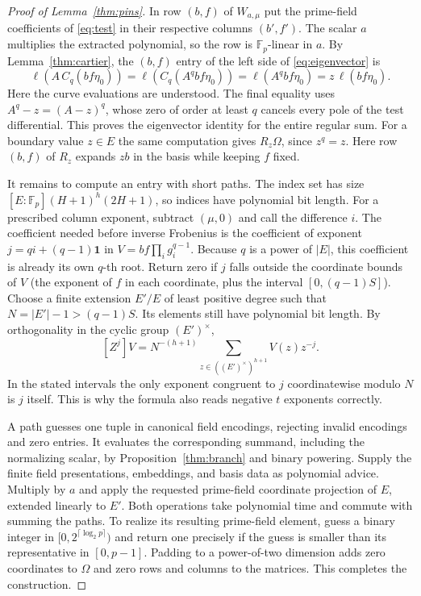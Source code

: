 \documentclass[11pt,letterpaper]{article}
\theoremstyle{definition}
\numberwithin{equation}{section}
\begin{document}
\begin{proof}[Proof of Lemma~\ref{thm:pins}]
In row $(b,f)$ of $W_{a,\mu}$ put the prime-field coefficients of \eqref{eq:test} in their
respective columns $(b',f')$. The scalar $a$ multiplies the extracted polynomial, so the row is
$\mathbb{F}_p$-linear in $a$. By Lemma~\ref{thm:cartier}, the $(b,f)$ entry of the left side of
\eqref{eq:eigenvector} is
\[
  \ell(A\,C_q(bf\eta_0))=\ell(C_q(A^q bf\eta_0))=\ell(A^q bf\eta_0)=z\,\ell(bf\eta_0).
\]
Here the curve evaluations are understood. The final equality uses $A^q-z=(A-z)^q$, whose
zero of order at least $q$ cancels every pole of the test differential. This proves the eigenvector
identity for the entire regular sum. For a boundary value $z\in E$ the same computation gives
$R_z \Omega$, since $z^q=z$. Here row $(b,f)$ of $R_z$ expands $zb$ in the basis while keeping $f$ fixed.

It remains to compute an entry with short paths. The index set has size
$[E:\mathbb{F}_p](H+1)^h(2H+1)$, so indices have polynomial bit length. For a prescribed column
exponent,
subtract $(\mu,0)$ and call the difference $i$. The coefficient needed before inverse Frobenius is
the coefficient of exponent $j=qi+(q-1)\mathbf{1}$ in $V=bf\prod_i g_i^{q-1}$. Because $q$ is a power of $|E|$,
this coefficient is already its own $q$-th root. Return zero if $j$ falls outside the coordinate
bounds of $V$ (the exponent of $f$ in each coordinate, plus the interval $[0,(q-1)S]$). Choose a
finite extension $E'/E$ of least positive degree such that $N=|E'|-1>(q-1)S$. Its elements
still have polynomial bit length. By orthogonality in the cyclic group $(E')^\times$,
\[
  [Z^j]V = N^{-(h+1)} \sum_{z\in((E')^\times)^{h+1}} V(z)z^{-j}.
\]
In the stated intervals the only exponent congruent to $j$ coordinatewise modulo $N$ is $j$ itself.
This is why the formula also reads negative $t$ exponents correctly.

A path guesses one tuple in canonical field encodings, rejecting invalid encodings and
zero entries. It evaluates the corresponding summand, including the normalizing scalar,
by Proposition~\ref{thm:branch} and binary powering. Supply the finite field presentations, embeddings,
and basis data as polynomial advice. Multiply by $a$ and apply the requested prime-field
coordinate projection of $E$, extended linearly to $E'$. Both operations take polynomial time
and commute with summing the paths. To realize its resulting prime-field element, guess
a binary integer in $[0,2^{\lceil \log_2 p\rceil})$ and return one precisely if the guess is smaller than its
representative in $[0,p-1]$. Padding to a power-of-two dimension adds zero coordinates to $\Omega$
and zero rows and columns to the matrices. This completes the construction.
\end{proof}
\end{document}
